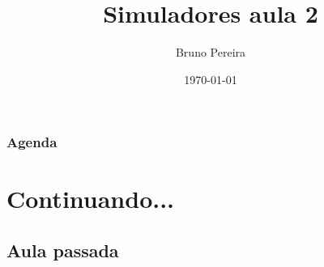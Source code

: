 \documentclass{beamer}
\title[Simuladores aula 2]{Simuladores aula 2} %
\author{Bruno Pereira} %
\institute[UFMG] %
{
Universidade Federal de Minas Gerais \\ %
\medskip
\textit{bruno.ps@dcc.ufmg.com} %
}
\date{\tiny\today} %
\begin{document}
\begin{frame}
\titlepage %
\end{frame}

\begin{frame}
\frametitle{Agenda} %
\tableofcontents %
\end{frame}


\section{Continuando...} %

\subsection{Aula passada} %
\end{document}
